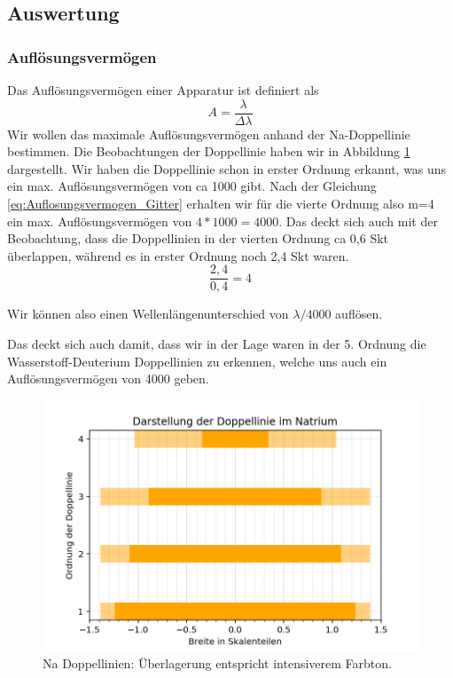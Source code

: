\documentclass[]{article}
\begin{document}
\subsection{Auswertung}
\subsubsection{Auflösungsvermögen}
Das Auflösungsvermögen einer Apparatur ist definiert als
\begin{equation}
	A=\frac{\lambda}{\Delta \lambda}
\end{equation}
Wir wollen das maximale Auflösungsvermögen anhand der Na-Doppellinie bestimmen. Die Beobachtungen der Doppellinie haben wir in Abbildung \ref{fig:Na-Doppellinie} dargestellt. Wir haben die Doppellinie schon in erster Ordnung erkannt, was uns ein max. Auflösungsvermögen von ca 1000 gibt.
Nach der Gleichung \ref{eq:Auflosungsvermogen_Gitter} erhalten wir für die vierte Ordnung also m=4 ein max. Auflösungsvermögen von $4*1000=4000$. Das deckt sich auch mit der Beobachtung, dass die Doppellinien in der vierten Ordnung ca 0,6 Skt überlappen, während es in erster Ordnung noch 2,4 Skt waren.
\[ \frac{2,4}{0,4}=4 \]

Wir können also einen Wellenlängenunterschied von $\lambda/4000$ auflösen.

Das deckt sich auch damit, dass wir in der Lage waren in der 5. Ordnung die Wasserstoff-Deuterium Doppellinien zu erkennen, welche uns auch ein Auflösungsvermögen von 4000 geben.
\begin{figure}
	\centering
	\includegraphics[width=1\linewidth]{Plots/Doppel_Na}
	\caption{Na Doppellinien: Überlagerung entspricht intensiverem Farbton.}
	\label{fig:Na-Doppellinie}
\end{figure}
\end{document}
